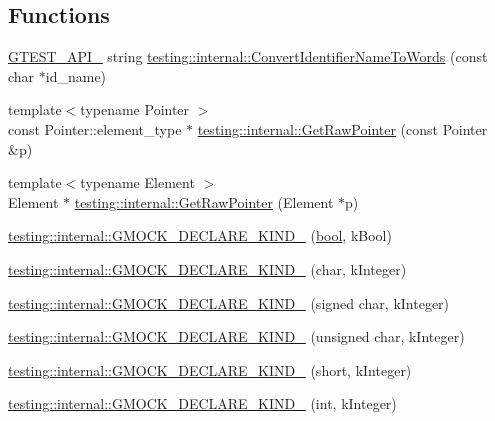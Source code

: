 \subsection*{Functions}
\begin{DoxyCompactItemize}
\item 
\hyperlink{gtest-port_8h_aa73be6f0ba4a7456180a94904ce17790}{G\+T\+E\+S\+T\+\_\+\+A\+P\+I\+\_\+} string \hyperlink{namespacetesting_1_1internal_a571db854f6de337007c53573c9cbf8a3}{testing\+::internal\+::\+Convert\+Identifier\+Name\+To\+Words} (const char $\ast$id\+\_\+name)
\item 
{\footnotesize template$<$typename Pointer $>$ }\\const Pointer\+::element\+\_\+type $\ast$ \hyperlink{namespacetesting_1_1internal_ae88d1a6f95165c43c27a6c0e2d357e61}{testing\+::internal\+::\+Get\+Raw\+Pointer} (const Pointer \&p)
\item 
{\footnotesize template$<$typename Element $>$ }\\Element $\ast$ \hyperlink{namespacetesting_1_1internal_a4d17b114b61b805ac5f37e9c26e29e55}{testing\+::internal\+::\+Get\+Raw\+Pointer} (Element $\ast$p)
\item 
\hyperlink{namespacetesting_1_1internal_a20f5584732e44a368e7acf295b639319}{testing\+::internal\+::\+G\+M\+O\+C\+K\+\_\+\+D\+E\+C\+L\+A\+R\+E\+\_\+\+K\+I\+N\+D\+\_\+} (\hyperlink{classbool}{bool}, k\+Bool)
\item 
\hyperlink{namespacetesting_1_1internal_ac8f3722ca21d8b14f86e5c949e843508}{testing\+::internal\+::\+G\+M\+O\+C\+K\+\_\+\+D\+E\+C\+L\+A\+R\+E\+\_\+\+K\+I\+N\+D\+\_\+} (char, k\+Integer)
\item 
\hyperlink{namespacetesting_1_1internal_ae5b8e77d245fd0838ab22e439e92e9af}{testing\+::internal\+::\+G\+M\+O\+C\+K\+\_\+\+D\+E\+C\+L\+A\+R\+E\+\_\+\+K\+I\+N\+D\+\_\+} (signed char, k\+Integer)
\item 
\hyperlink{namespacetesting_1_1internal_ab13e89be2f0f22b1da9e22cd53bce5ce}{testing\+::internal\+::\+G\+M\+O\+C\+K\+\_\+\+D\+E\+C\+L\+A\+R\+E\+\_\+\+K\+I\+N\+D\+\_\+} (unsigned char, k\+Integer)
\item 
\hyperlink{namespacetesting_1_1internal_af191a2be9cff1d5900426ef5aa59851e}{testing\+::internal\+::\+G\+M\+O\+C\+K\+\_\+\+D\+E\+C\+L\+A\+R\+E\+\_\+\+K\+I\+N\+D\+\_\+} (short, k\+Integer)
\item 
\hyperlink{namespacetesting_1_1internal_a59fb8e3bb6f1fec656ed8bdab0048f9f}{testing\+::internal\+::\+G\+M\+O\+C\+K\+\_\+\+D\+E\+C\+L\+A\+R\+E\+\_\+\+K\+I\+N\+D\+\_\+} (int, k\+Integer)

\end{DoxyCompactItemize}
